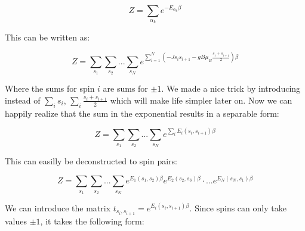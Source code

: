 \documentclass[12pt]{article}
\theoremstyle{plain}
\begin{document}
\vspace{2mm}

\begin{equation*}
    Z = \sum_{\alpha_k} e^{-E_{\alpha_k}\beta}
\end{equation*}

\vspace{2mm}

\par This can be written as:

\vspace{2mm}

\begin{equation*}
    Z = \sum_{s_1}\sum_{s_2}...\sum_{s_N} e^{\sum_{i=1}^{N}(-Js_i s_{i+1} - gB\mu_{B}\frac{s_i + s_{i+1}}{2})\beta}
\end{equation*}

\vspace{2mm}

\par Where the sums for spin $i$ are sums for $\pm 1$. We made a nice trick by introducing
instead of $\sum_i s_i$, $\sum_{i}\frac{s_i + s_{i+1}}{2}$ which will make life simpler later on.
Now we can happily realize that the sum in the exponential results in a separable form:

\vspace{2mm}

\begin{equation*}
    Z = \sum_{s_1}\sum_{s_2}...\sum_{s_N} e^{\sum_{i}E_{i}(s_i, s_{i+1})\beta} 
\end{equation*}

\vspace{2mm}

\par This can easilly be deconstructed to spin pairs:

\vspace{2mm}

\begin{equation*}
    Z = \sum_{s_1}\sum_{s_2}...\sum_{s_N} e^{E_{1}(s_1, s_2)\beta}e^{E_{2}(s_2, s_3)\beta}\cdot ... e^{E_{N}(s_N, s_1)\beta} 
\end{equation*}

\vspace{2mm}

\par We can introduce the matrix  $t_{s_i, s_{i+1}} = e^{E_{i}(s_i, s_{i+1})\beta}$. Since spins can only
take values $\pm 1$, it takes the following form:

\vspace{2mm}
\end{document}
